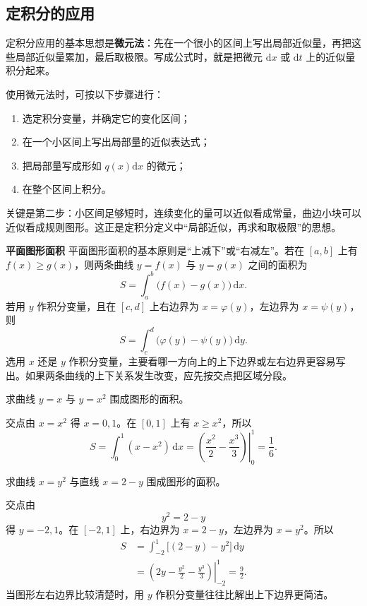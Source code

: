 \documentclass[fontset=fandol]{ctexart}
\newenvironment{custom}[1]{\par\noindent\textbf{#1}\quad}{\par\vspace{0.8em}}
\newcommand{\dd}{\mathrm{d}}
\begin{document}
\subsection{定积分的应用}

定积分应用的基本思想是\textbf{微元法}：先在一个很小的区间上写出局部近似量，再把这些局部近似量累加，最后取极限。写成公式时，就是把微元 $\dd x$ 或 $\dd t$ 上的近似量积分起来。

使用微元法时，可按以下步骤进行：
\begin{enumerate}
\item 选定积分变量，并确定它的变化区间；
\item 在一个小区间上写出局部量的近似表达式；
\item 把局部量写成形如 $q(x)\dd x$ 的微元；
\item 在整个区间上积分。
\end{enumerate}
关键是第二步：小区间足够短时，连续变化的量可以近似看成常量，曲边小块可以近似看成规则图形。这正是定积分定义中“局部近似，再求和取极限”的思想。

\begin{custom}{平面图形面积}
平面图形面积的基本原则是“上减下”或“右减左”。若在 $[a,b]$ 上有 $f(x)\geq g(x)$，则两条曲线 $y=f(x)$ 与 $y=g(x)$ 之间的面积为
\[
S=\int_a^b\bigl(f(x)-g(x)\bigr)\,\dd x.
\]
若用 $y$ 作积分变量，且在 $[c,d]$ 上右边界为 $x=\varphi(y)$，左边界为 $x=\psi(y)$，则
\[
S=\int_c^d\bigl(\varphi(y)-\psi(y)\bigr)\,\dd y.
\]
选用 $x$ 还是 $y$ 作积分变量，主要看哪一方向上的上下边界或左右边界更容易写出。如果两条曲线的上下关系发生改变，应先按交点把区域分段。
\end{custom}

\begin{example}[两曲线围成面积]
求曲线 $y=x$ 与 $y=x^2$ 围成图形的面积。

交点由 $x=x^2$ 得 $x=0,1$。在 $[0,1]$ 上有 $x\geq x^2$，所以
\[
S=\int_0^1(x-x^2)\,\dd x
=\left.\left(\frac{x^2}{2}-\frac{x^3}{3}\right)\right|_0^1
=\frac16.
\]
\end{example}

\begin{example}[用 $y$ 作积分变量]
求曲线 $x=y^2$ 与直线 $x=2-y$ 围成图形的面积。

交点由
\[
y^2=2-y
\]
得 $y=-2,1$。在 $[-2,1]$ 上，右边界为 $x=2-y$，左边界为 $x=y^2$。所以
\[
\begin{aligned}
S&=\int_{-2}^1\bigl[(2-y)-y^2\bigr]\,\dd y\\
&=\left.\left(2y-\frac{y^2}{2}-\frac{y^3}{3}\right)\right|_{-2}^{1}
=\frac92.
\end{aligned}
\]
当图形左右边界比较清楚时，用 $y$ 作积分变量往往比解出上下边界更简洁。
\end{example}
\end{document}
